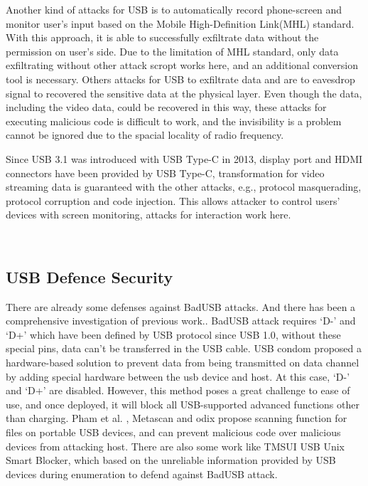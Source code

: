 Another kind of attacks for USB \cite{JFC} is to automatically record phone-screen and monitor user's input based on  the Mobile High-Definition Link(MHL) standard. With this approach, it is able to successfully exfiltrate data without the permission on user's side. Due to the limitation of MHL standard, only data exfiltrating without other attack scropt works here, and an additional conversion tool is necessary. Others attacks for USB to exfiltrate data\cite{smartphone}\cite{poweremi} and \cite{usbdriver} are to eavesdrop signal to recovered the sensitive data at the physical layer. Even though the data, including the video data, could be recovered in this way, these attacks for executing malicious code is difficult to work, and the invisibility is a problem cannot be ignored due to the spacial locality of radio frequency. 



Since USB 3.1 was introduced with USB Type-C in 2013, display port and HDMI connectors have been provided by USB Type-C, transformation for video streaming data is guaranteed with the other attacks, e.g., protocol masquerading,  protocol corruption and code injection. This allows attacker to control users' devices with screen monitoring, attacks for interaction work here.



\\

\subsection{USB Defence Security}
There are already some defenses against BadUSB attacks. 
And there has been a comprehensive investigation of previous work.\cite{sok}.
BadUSB attack requires `D-' and `D+' which have been defined by USB protocol since USB 1.0\cite{usb10},
without these special pins, data can't be transferred in the USB cable. USB condom \cite{Condom} proposed a hardware-based solution to prevent data from being transmitted on data channel by adding special hardware between the usb device and host. At this case, `D-' and `D+' are disabled.
However, this method poses a great challenge to ease of use, and once deployed, it will block all USB-supported advanced functions other than charging. Pham et al. \cite{pham2010optimizing}, Metascan \cite{OPSWAT} and odix\cite{OLEA} propose scanning function for files on portable USB devices, and can prevent malicious code over malicious devices from attacking host.
There are also some work like TMSUI\cite{yang2015tmsui} USB
Unix Smart Blocker\cite{diwan2014complete}, which based on the unreliable information provided by USB devices during enumeration to defend against BadUSB attack.

